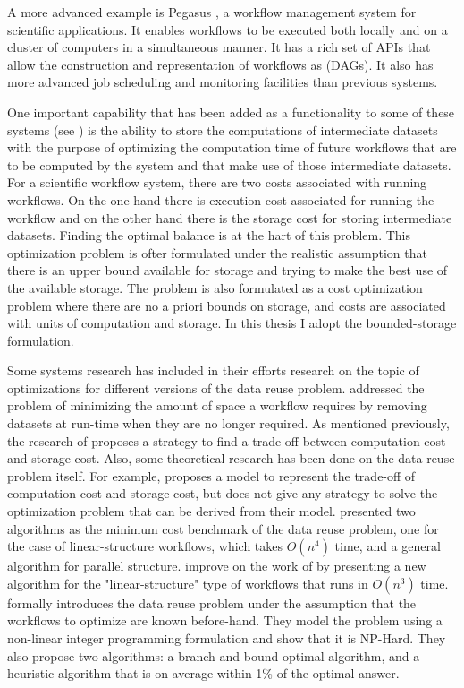A more advanced example is Pegasus \citep{singh2008workflow}, a workflow management system for scientific applications.  It enables workflows to be executed both locally and on a cluster of computers in a simultaneous manner.  It has a rich set of APIs that allow the construction and representation of workflows as (DAGs).  It also has more advanced job scheduling and monitoring facilities than previous systems.  

One important capability that has been added as a functionality to some of these systems (see \cite{yuan2012data}) is the ability to store the computations of intermediate datasets with the purpose of optimizing the computation time of future workflows that are to be computed by the system and that make use of those intermediate datasets. For a scientific workflow system, there are two costs associated with running workflows.  On the one hand there is execution cost associated for running the workflow and on the other hand there is the storage cost for storing intermediate datasets.  Finding the optimal balance is at the hart of this problem.  This optimization problem is ofter formulated under the realistic assumption that there is an upper bound available for storage and trying to make the best use of the available storage.  The problem is also formulated as a cost optimization problem where there are no a priori bounds on storage, and costs are associated with units of computation and storage.  In this thesis I adopt the bounded-storage formulation.

Some systems research has included in their efforts research on the topic of optimizations for different versions of the data reuse problem.  \cite{ramakrishnan2007scheduling} addressed the problem of minimizing the amount of space a workflow requires by removing datasets at run-time when they are no longer required.  As mentioned previously, the research of \cite{yuan2012data} proposes a strategy to find a trade-off between computation cost and storage cost. Also, some theoretical research has been done on the data reuse problem itself. For example, \cite{adams2009maximizing} proposes a model to represent the trade-off of computation cost and storage cost, but does not give any strategy to solve the optimization problem that can be derived from their model. \cite{yuan2011demand} presented two algorithms as the minimum cost benchmark of the data reuse problem, one for the case of linear-structure workflows, which takes $O(n^4)$ time, and a general algorithm for parallel structure. \cite{cheng2015new} improve on the work of \cite{yuan2011demand} by presenting a new algorithm for the "linear-structure" type of workflows that runs in $O(n^3)$ time. \cite{zohrevandi2013bounded} formally introduces the data reuse problem under the assumption that the workflows to optimize are known before-hand. They model the problem using a non-linear integer programming formulation and show that  it is NP-Hard.  They also propose two algorithms: a branch and bound optimal algorithm, and a heuristic algorithm that is on average within 1\% of the optimal answer.
